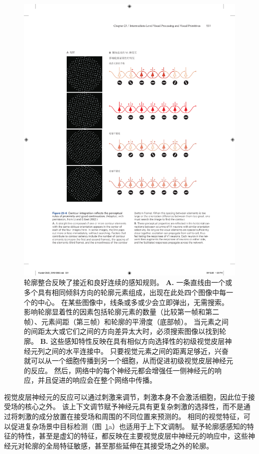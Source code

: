 \begin{figure}[htbp]
	\centering
	\includegraphics[width=1.0\linewidth]{chap23/fig_23_6}
	\caption{轮廓整合反映了接近和良好连续的感知规则\cite{li2002global}。
		\textbf{A.} 一条直线由一个或多个具有相同倾斜方向的轮廓元素组成，出现在此处四个图像中每一个的中心。
		在某些图像中，线条或多或少会立即弹出，无需搜索。
		影响轮廓显着性的因素包括轮廓元素的数量（比较第一帧和第二帧）、元素间距（第三帧）和轮廓的平滑度（底部帧）。
		当元素之间的间距太大或它们之间的方向差异太大时，必须搜索图像以找到轮廓。
		\textbf{B.} 这些感知特性反映在具有相似方向选择性的初级视觉皮层神经元列之间的水平连接中。
		只要视觉元素之间的距离足够近，兴奋就可以从一个细胞传播到另一个细胞，从而促进初级视觉皮层神经元的反应。
		然后，网络中的每个神经元都会增强任一侧神经元的响应，并且促进的响应会在整个网络中传播。}
	\label{fig:23_6}
\end{figure}


视觉皮层神经元的反应可以通过刺激来调节，刺激本身不会激活细胞，因此位于接受场的核心之外。
该上下文调节赋予神经元具有更复杂刺激的选择性，而不是通过将刺激的成分放置在接受场和周围的不同位置来预测的。
相同的视觉特征，可以促进复杂场景中目标检测（图~\ref{fig:23_6}a）也适用于上下文调制。
赋予轮廓感感知的特征的特性，甚至是虚幻的特征，都反映在主要视觉皮层中神经元的响应中，这些神经元对轮廓的全局特征敏感，甚至那些延伸在其接受场之外的轮廓。



